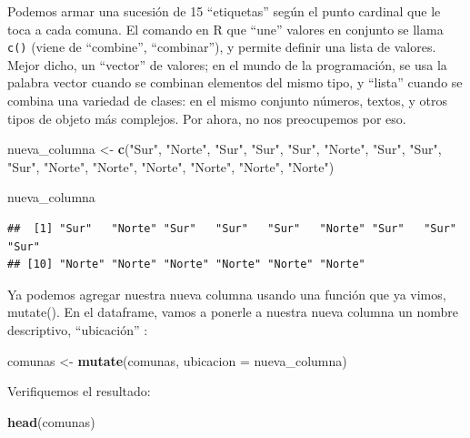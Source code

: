 \documentclass[spanish,]{book}
\newenvironment{Shaded}{\begin{snugshade}}{\end{snugshade}}
\newcommand{\DataTypeTok}[1]{\textcolor[rgb]{0.13,0.29,0.53}{#1}}
\newcommand{\KeywordTok}[1]{\textcolor[rgb]{0.13,0.29,0.53}{\textbf{#1}}}
\newcommand{\NormalTok}[1]{#1}
\newcommand{\StringTok}[1]{\textcolor[rgb]{0.31,0.60,0.02}{#1}}
\begin{document}
Podemos armar una sucesión de 15 ``etiquetas'' según el punto cardinal que le toca a cada comuna. El comando en R que ``une'' valores en conjunto se llama \texttt{c()} (viene de ``combine'', ``combinar''), y permite definir una lista de valores. Mejor dicho, un ``vector'' de valores; en el mundo de la programación, se usa la palabra vector cuando se combinan elementos del mismo tipo, y ``lista'' cuando se combina una variedad de clases: en el mismo conjunto números, textos, y otros tipos de objeto más complejos. Por ahora, no nos preocupemos por eso.

\begin{Shaded}
\begin{Highlighting}[]
\NormalTok{nueva_columna <-}\StringTok{ }\KeywordTok{c}\NormalTok{(}\StringTok{"Sur"}\NormalTok{, }\StringTok{"Norte"}\NormalTok{, }\StringTok{"Sur"}\NormalTok{, }\StringTok{"Sur"}\NormalTok{, }\StringTok{"Sur"}\NormalTok{, }\StringTok{"Norte"}\NormalTok{, }\StringTok{"Sur"}\NormalTok{, }\StringTok{"Sur"}\NormalTok{, }\StringTok{"Sur"}\NormalTok{, }\StringTok{"Norte"}\NormalTok{, }\StringTok{"Norte"}\NormalTok{, }\StringTok{"Norte"}\NormalTok{, }\StringTok{"Norte"}\NormalTok{, }\StringTok{"Norte"}\NormalTok{, }\StringTok{"Norte"}\NormalTok{)}

\NormalTok{nueva_columna}
\end{Highlighting}
\end{Shaded}

\begin{verbatim}
##  [1] "Sur"   "Norte" "Sur"   "Sur"   "Sur"   "Norte" "Sur"   "Sur"   "Sur"  
## [10] "Norte" "Norte" "Norte" "Norte" "Norte" "Norte"
\end{verbatim}

Ya podemos agregar nuestra nueva columna usando una función que ya vimos, mutate(). En el dataframe, vamos a ponerle a nuestra nueva columna un nombre descriptivo, ``ubicación'' :

\begin{Shaded}
\begin{Highlighting}[]
\NormalTok{comunas <-}\StringTok{ }\KeywordTok{mutate}\NormalTok{(comunas, }\DataTypeTok{ubicacion =}\NormalTok{ nueva_columna)}
\end{Highlighting}
\end{Shaded}

Verifiquemos el resultado:

\begin{Shaded}
\begin{Highlighting}[]
\KeywordTok{head}\NormalTok{(comunas)}
\end{Highlighting}
\end{Shaded}
\end{document}
